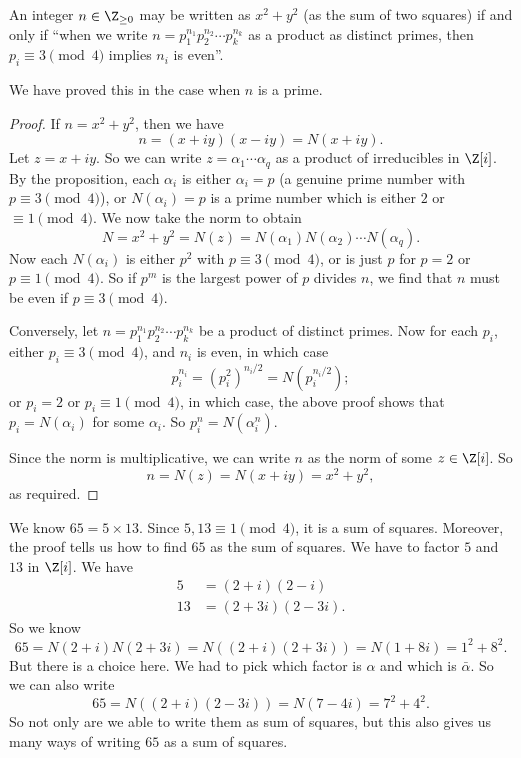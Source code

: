 \documentclass[a4paper]{article}
\begin{document}
\begin{cor}
  An integer $n \in \Z_{\geq 0}$ may be written as $x^2 + y^2$ (as the sum of two squares) if and only if ``when we write $n = p_1^{n_1} p_2^{n_2} \cdots p_k^{n_k}$ as a product as distinct primes, then $p_i \equiv 3 \pmod 4$ implies $n_i$ is even''.
\end{cor}

We have proved this in the case when $n$ is a prime.

\begin{proof}
  If $n = x^2 + y^2$, then we have
  \[
    n = (x + iy)(x - iy) = N(x + iy).
  \]
  Let $z = x + iy$. So we can write $z = \alpha_1 \cdots \alpha_q$ as a product of irreducibles in $\Z[i]$. By the proposition, each $\alpha_i$ is either $\alpha_i = p$ (a genuine prime number with $p \equiv 3\pmod 4$), or $N(\alpha_i) = p$ is a prime number which is either $2$ or $\equiv 1 \pmod 4$. We now take the norm to obtain
  \[
    N = x^2 + y^2 = N(z) = N(\alpha_1) N(\alpha_2) \cdots N(\alpha_q).
  \]
  Now each $N(\alpha_i)$ is either $p^2$ with $p \equiv 3\pmod 4$, or is just $p$ for $p = 2$ or $p \equiv 1\pmod 4$. So if $p^m$ is the largest power of $p$ divides $n$, we find that $n$ must be even if $p \equiv 3 \pmod 4$.

  Conversely, let $n = p_1^{n_1} p_2^{n_2} \cdots p_k^{n_k}$ be a product of distinct primes. Now for each $p_i$, either $p_i \equiv 3 \pmod 4$, and $n_i$ is even, in which case
  \[
    p_i^{n_i} = (p_i^2)^{n_i/2} = N(p_i^{n_i/2});
  \]
  or $p_i = 2$ or $p_i \equiv 1 \pmod 4$, in which case, the above proof shows that $p_i = N(\alpha_i)$ for some $\alpha_i$. So $p_i^n = N(\alpha_i^n)$.

  Since the norm is multiplicative, we can write $n$ as the norm of some $z \in \Z[i]$. So
  \[
    n = N(z) = N(x + iy) = x^2 + y^2,
  \]
  as required.
\end{proof}

\begin{eg}
  We know $65 = 5 \times 13$. Since $5, 13 \equiv 1 \pmod 4$, it is a sum of squares. Moreover, the proof tells us how to find $65$ as the sum of squares. We have to factor $5$ and $13$ in $\Z[i]$. We have
  \begin{align*}
    5 &= (2 + i)(2 - i)\\
    13 &= (2 + 3i)(2 - 3i).
  \end{align*}
  So we know
  \[
    65 = N(2 + i)N(2 + 3i) = N((2 + i)(2 + 3i)) = N(1 + 8i) = 1^2 + 8^2.
  \]
  But there is a choice here. We had to pick which factor is $\alpha$ and which is $\bar{\alpha}$. So we can also write
  \[
    65 = N((2 + i)(2 - 3i)) = N(7 - 4i) = 7^2 + 4^2.
  \]
  So not only are we able to write them as sum of squares, but this also gives us many ways of writing $65$ as a sum of squares.
\end{eg}
\end{document}
